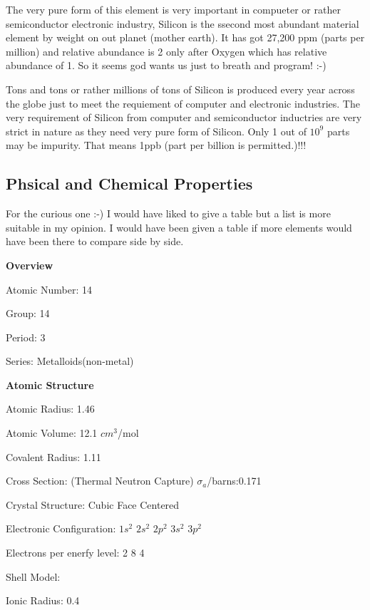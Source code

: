 The very pure form of this element is very important in compueter or
rather semiconductor electronic industry, Silicon is the ssecond most
abundant material element by weight on out planet (mother earth). It
has got 27,200 ppm (parts per million) and relative abundance is 2
only after Oxygen which has relative abundance of 1. So it seems god
wants us just to breath and program! :-)

Tons and tons or rather millions of tons of Silicon is produced every
year across the globe just to meet the requiement of computer and
electronic industries. The very requirement of Silicon from computer
and semiconductor inductries are very strict in nature as they need
very pure form of Silicon. Only 1 out of $10^9$ parts may be
impurity. That means 1ppb (part per billion is permitted.)!!!

\subsection{Phsical and Chemical Properties}
For the curious one :-) I would have liked to give a table but a list
is more suitable in my opinion. I would have been given a table if
more elements would have been there to compare side by side.
\startitemize[n]
\item {\bf Overview}
\startitemize[r]
\item Atomic Number: 14
\item Group: 14
\item Period: 3
\item Series: Metalloids(non-metal)
\stopitemize
\item {\bf Atomic Structure}
\startitemize[r]
\item Atomic Radius: 1.46 \Angstrom
\item Atomic Volume: 12.1 $cm^3$/mol
\item Covalent Radius: 1.11 \Angstrom
\item Cross Section: (Thermal Neutron Capture) $\sigma_a$/barns:0.171
\item Crystal Structure: Cubic Face Centered
\item Electronic Configuration: $1s^2$ $2s^2$ $2p^2$ $3s^2$ $3p^2$
\item Electrons per enerfy level: 2 8 4
\item Shell Model: 
\
\item Ionic Radius: 0.4 \Angstrom
